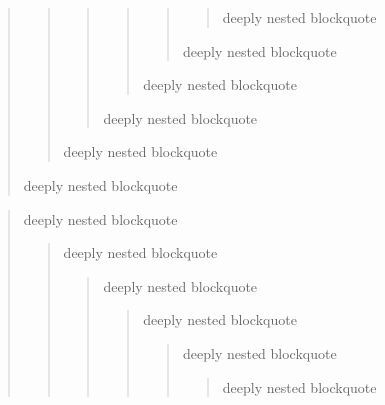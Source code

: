 \begin{quote}
\begin{quote}
\begin{quote}
\begin{quote}
\begin{quote}
\begin{quote}
deeply nested blockquote \end{quote}
deeply nested blockquote \end{quote}
deeply nested blockquote \end{quote}
deeply nested blockquote \end{quote}
deeply nested blockquote \end{quote}
deeply nested blockquote \end{quote}
\begin{quote}
deeply nested blockquote \begin{quote}
deeply nested blockquote \begin{quote}
deeply nested blockquote \begin{quote}
deeply nested blockquote \begin{quote}
deeply nested blockquote \begin{quote}
deeply nested blockquote \end{quote}
\end{quote}
\end{quote}
\end{quote}
\end{quote}
\end{quote}
